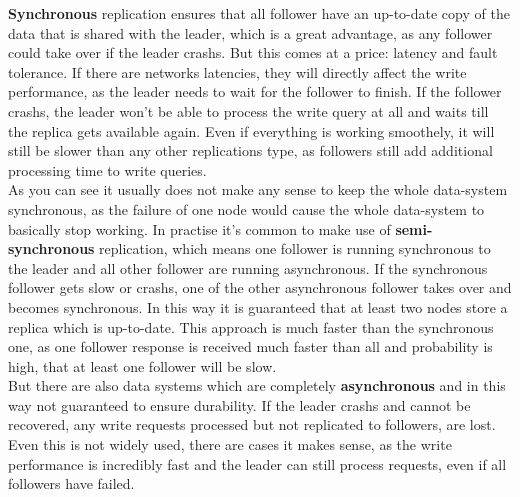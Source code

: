 {\textbf{Synchronous} replication ensures that all follower have an up-to-date copy of the data that is shared with the leader, which is a great advantage, as any follower could take over if the leader crashs. But this comes at a price: latency and fault tolerance. If there are networks latencies, they will directly affect the write performance, as the leader needs to wait for the follower to finish. If the follower crashs, the leader won't be able to process the write query at all and waits till the replica gets available again. Even if everything is working smoothely, it will still be slower than any other replications type, as followers still add additional processing time to write queries.\\
As you can see it usually does not make any sense to keep the whole data-system synchronous, as the failure of one node would cause the whole data-system to basically stop working. In practise it's common to make use of \textbf{semi-synchronous} replication, which means one follower is running synchronous to the leader and all other follower are running asynchronous. If the synchronous follower gets slow or crashs, one of the other asynchronous follower takes over and becomes synchronous. In this way it is guaranteed that at least two nodes store a replica which is up-to-date. This approach is much faster than the synchronous one, as one follower response is received much faster than all and probability is high, that at least one follower will be slow.\\
But there are also data systems which are completely \textbf{asynchronous} and in this way not guaranteed to ensure durability. If the leader crashs and cannot be recovered, any write requests processed but not replicated to followers, are lost. Even this is not widely used, there are cases it makes sense, as the write performance is incredibly fast and the leader can still process requests, even if all followers have failed.\\

}
